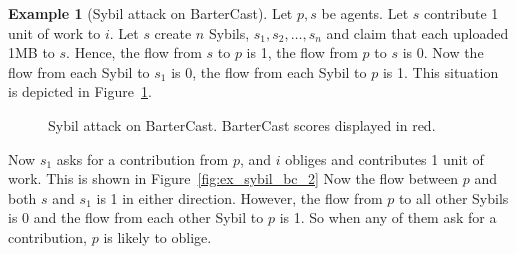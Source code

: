\documentclass[a4paper,11pt]{book}
\theoremstyle{definition}
\newtheorem{example}{Example}
\begin{document}
\begin{example}[Sybil attack on BarterCast]
    Let $p, s$ be agents. Let $s$ contribute 1 unit of work to $i$. 
    Let $s$ create $n$ Sybils, $s_1, s_2, \ldots, s_n$ and claim that each uploaded 1MB to $s$.
    Hence, the flow from $s$ to $p$ is 1, the flow
    from $p$ to $s$ is 0. Now the flow from each Sybil to $s_1$ is $0$, the flow from each Sybil to $p$ is 1.
    This situation is depicted in Figure~\ref{fig:ex_sybil_bc}.



\begin{figure}[h]
    \centering
     \caption{Sybil attack on BarterCast. BarterCast scores displayed in red.}
     \label{fig:ex_sybil_bc}
\end{figure}

    Now $s_1$ asks
    for a contribution from $p$, and $i$ obliges and contributes 1 unit of work. This is
    shown in Figure~\ref{fig:ex_sybil_bc_2}
    Now the flow between $p$ and both $s$ and $s_1$  is
    1 in either direction. 
    However, the flow from $p$ to all other Sybils is 0 and the flow from each other Sybil to $p$ is 1. 
    So when any of them ask for a contribution, $p$ is likely to oblige. 




\end{example}
\end{document}
